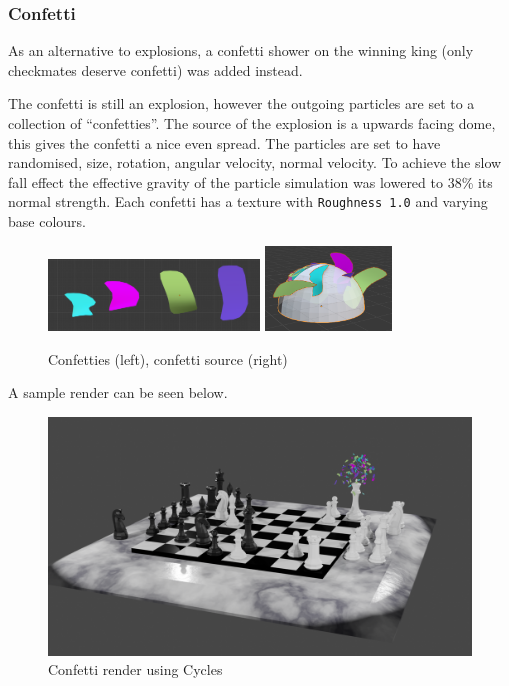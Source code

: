 \documentclass[11pt]{article}
\begin{document}
\subsubsection{Confetti}
\label{sec:orga7f18d5}
As an alternative to explosions, a confetti shower on the winning king (only
checkmates deserve confetti) was added instead.

The confetti is still an explosion, however the outgoing particles are set to a
collection of ``confetties''. The source of the explosion is a upwards facing
dome, this gives the confetti a nice even spread. The particles are set to have
randomised, size, rotation, angular velocity, normal velocity. To achieve the
slow fall effect the effective gravity of the particle simulation was lowered to
38\% its normal strength. Each confetti has a texture with \texttt{Roughness 1.0} and
varying base colours.

\begin{figure}[htbp]
\begin{center}
\includegraphics[width=0.5\textwidth]{Images/confetties.png}
\includegraphics[width=0.3\textwidth]{Images/confetti dome.png}
\end{center}
\caption{Confetties (left), confetti source (right)}
\end{figure}

A sample render can be seen below.
\begin{figure}[htbp]
\centering
\includegraphics[width=\textwidth]{Images/Confetti! cycles.png}
\caption{Confetti render using Cycles}
\end{figure}
\end{document}
